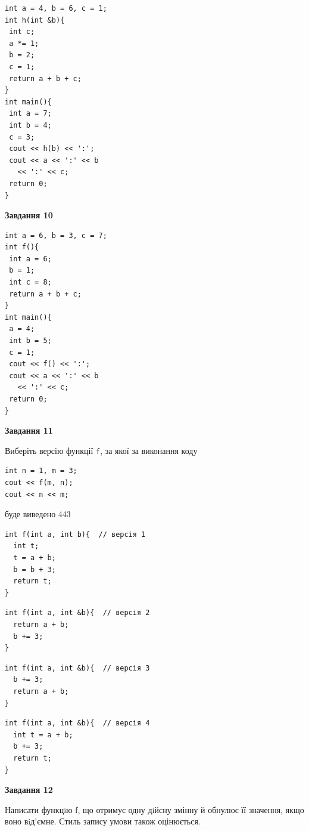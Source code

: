 \documentclass[12pt, ukrainian]{article}
\def\code#1{\Verb!#1!}
\begin{document}
{\begin {large}
\begin{minipage}[t]{7.0cm}
\begin{verbatim}
int a = 4, b = 6, c = 1;
int h(int &b){
 int c;
 a *= 1;
 b = 2;
 c = 1;
 return a + b + c;
}
int main(){
 int a = 7;
 int b = 4;
 c = 3;
 cout << h(b) << ':';
 cout << a << ':' << b 
   << ':' << c;
 return 0;
}
\end{verbatim}



\begin{center}
\textbf{Завдання 10}
\end{center}
\vspace{-8mm}

\begin{verbatim}
int a = 6, b = 3, c = 7;
int f(){
 int a = 6;
 b = 1;
 int c = 8;
 return a + b + c;
}
int main(){
 a = 4;
 int b = 5;
 c = 1;
 cout << f() << ':';
 cout << a << ':' << b 
   << ':' << c;
 return 0;
}
\end{verbatim}

\end{minipage}
\vline \hspace{1mm}
\begin{minipage}[t]{11.0cm}

\begin{center}
\textbf{Завдання 11}
\end{center}
Виберіть версію функції \code{f}, за якої за виконання коду
\begin{verbatim}
int n = 1, m = 3;
cout << f(m, n);
cout << n << m;
\end{verbatim}

буде виведено 443

\begin{verbatim}
int f(int a, int b){  // версія 1
  int t;
  t = a + b;
  b = b + 3;
  return t;
}
\end{verbatim}

\vspace{-8mm}\begin{verbatim}
int f(int a, int &b){  // версія 2
  return a + b;
  b += 3;
}
\end{verbatim}

\vspace{-8mm}\begin{verbatim}
int f(int a, int &b){  // версія 3
  b += 3;
  return a + b;
}
\end{verbatim}

\vspace{-8mm}\begin{verbatim}
int f(int a, int &b){  // версія 4
  int t = a + b;
  b += 3;
  return t;
}
\end{verbatim}



\begin{center}
\textbf{Завдання 12}
\end{center}

Написати функцiю f, що отримує одну дiйсну змінну й обнулює її значення, якщо воно вiд'ємне. Стиль запису умови також оцінюється.\par

\end{minipage}

\end {large}}
\newpage
\end{document}
